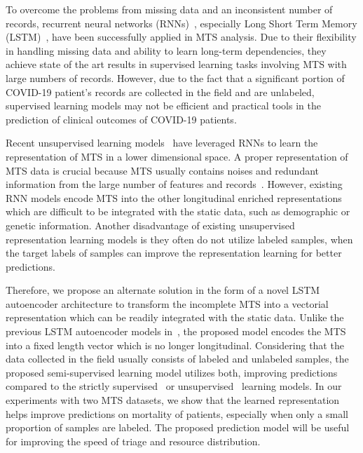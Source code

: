 To overcome the problems from missing data and an inconsistent number of records, recurrent neural networks (RNNs)~\cite{medsker2001recurrent}, especially Long Short Term Memory (LSTM)~\cite{schmidhuber1997long}, have been successfully applied in MTS analysis. Due to their flexibility in handling missing data and ability to learn long-term dependencies, they achieve state of the art results in supervised learning tasks involving MTS with large numbers of records. However, due to the fact that a significant portion of COVID-19 patient's records are collected in the field and are unlabeled, supervised learning models may not be efficient and practical tools in the prediction of clinical outcomes of COVID-19 patients.

Recent unsupervised learning models~\cite{srivastava2015unsupervised,langkvist2014review,saumya2020spam,hinton2006reducing} have leveraged RNNs to learn the representation of MTS in a lower dimensional space. A proper representation of MTS data is crucial because MTS usually contains noises and redundant information from the large number of features and records~\cite{tuncel2018autoregressive,langkvist2014review}. However, existing RNN models encode MTS into the other longitudinal enriched representations which are difficult to be integrated with the static data, such as demographic or genetic information. Another disadvantage of existing unsupervised representation learning models is they often do not utilize labeled samples, when the target labels of samples can improve the representation learning for better predictions.

Therefore, we propose an alternate solution in the form of a novel LSTM autoencoder architecture to transform the incomplete MTS into a vectorial representation which can be readily integrated with the static data. Unlike the previous LSTM autoencoder models in~\cite{srivastava2015unsupervised,langkvist2014review,saumya2020spam}, the proposed model encodes the MTS into a fixed length vector which is no longer longitudinal. Considering that the data collected in the field usually consists of labeled and unlabeled samples, the proposed semi-supervised learning model utilizes both, improving predictions compared to the strictly supervised~\cite{yan2020interpretable} or unsupervised~\cite{langkvist2014review,srivastava2015unsupervised} learning models. In our experiments with two MTS datasets, we show that the learned representation helps improve predictions on mortality of patients, especially when only a small proportion of samples are labeled. The proposed prediction model will be useful for improving the speed of triage and resource distribution.

